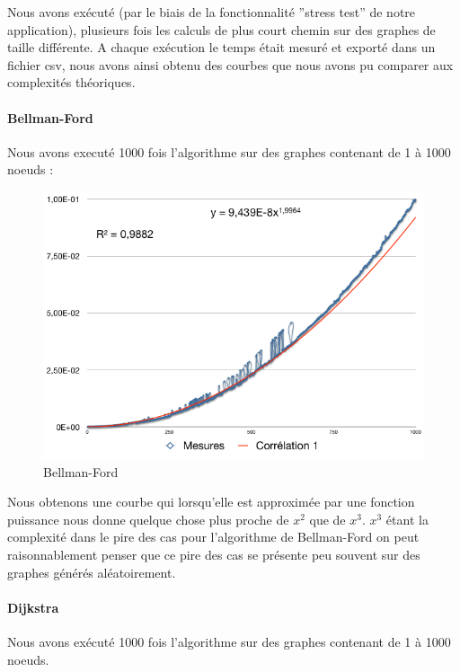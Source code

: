 \documentclass[a4paper,12pt,final] {article}
\begin{document}
Nous avons exécuté (par le biais de la fonctionnalité ''stress test'' de notre application), plusieurs fois les calculs de plus court chemin sur des graphes de taille différente. A chaque exécution le temps était mesuré et exporté dans un fichier csv, nous avons ainsi obtenu des courbes que nous avons pu comparer aux complexités théoriques.
\paragraph{Bellman-Ford}
Nous avons executé 1000 fois l'algorithme sur des graphes contenant de 1 à 1000 noeuds :

\begin{figure}[htpd]
\begin{center}
\includegraphics[scale=0.4]{bellman}
\end{center}
\caption{Bellman-Ford}
\end{figure}

Nous obtenons une courbe qui lorsqu'elle est approximée par une fonction puissance nous donne quelque chose plus proche de $x^{2}$ que de $x^{3}$. $x^{3}$ étant la complexité dans le pire des cas pour l'algorithme de Bellman-Ford on peut raisonnablement penser que ce pire des cas se présente peu souvent sur des graphes générés aléatoirement.
\paragraph{Dijkstra}
Nous avons exécuté 1000 fois l'algorithme sur des graphes contenant de 1 à 1000 noeuds.
\end{document}
